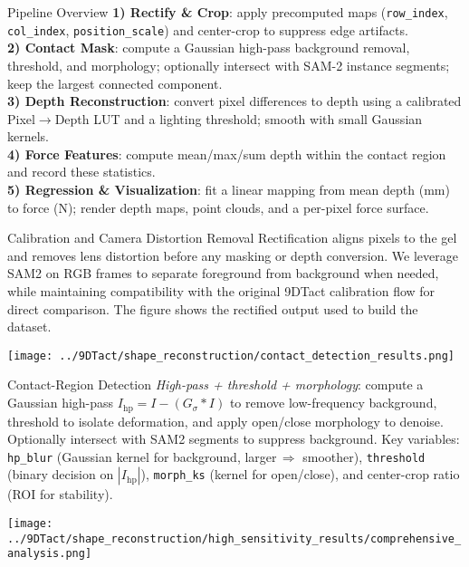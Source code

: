 \documentclass[final]{beamer}
\newlength{\colwidth}
\begin{document}
\begin{frame}[t]
\begin{columns}[t]
\begin{column}{\colwidth}
  \begin{alertblock}{Pipeline Overview}
  \textbf{1) Rectify \& Crop}: apply precomputed maps (\texttt{row\_index}, \texttt{col\_index}, \texttt{position\_scale}) and center-crop to suppress edge artifacts.\\
  \textbf{2) Contact Mask}: compute a Gaussian high-pass background removal, threshold, and morphology; optionally intersect with SAM-2 instance segments; keep the largest connected component.\\
  \textbf{3) Depth Reconstruction}: convert pixel differences to depth using a calibrated Pixel$\rightarrow$Depth LUT and a lighting threshold; smooth with small Gaussian kernels.\\
  \textbf{4) Force Features}: compute mean/max/sum depth within the contact region and record these statistics.\\
  \textbf{5) Regression \& Visualization}: fit a linear mapping from mean depth (mm) to force (N); render depth maps, point clouds, and a per-pixel force surface.
  \end{alertblock}

  \begin{block}{Calibration and Camera Distortion Removal}
  Rectification aligns pixels to the gel and removes lens distortion before any masking or depth conversion. We leverage SAM2 on RGB frames to separate foreground from background when needed, while maintaining compatibility with the original 9DTact calibration flow for direct comparison. The figure shows the rectified output used to build the dataset.
  \begin{center}
    \texttt{[image: ../9DTact/shape\_reconstruction/contact\_detection\_results.png]}
  \end{center}
  \end{block}

  \begin{block}{Contact-Region Detection}
  \textit{High-pass + threshold + morphology}: compute a Gaussian high-pass \(I_{\mathrm{hp}} = I - (G_{\sigma}\!*I)\) to remove low-frequency background, threshold to isolate deformation, and apply open/close morphology to denoise. Optionally intersect with SAM2 segments to suppress background. Key variables: \texttt{hp\_blur} (Gaussian kernel for background, larger\,$\Rightarrow$ smoother), \texttt{threshold} (binary decision on \(|I_{\mathrm{hp}}|\)), \texttt{morph\_ks} (kernel for open/close), and center-crop ratio (ROI for stability).  
  \begin{center}
    \texttt{[image: ../9DTact/shape\_reconstruction/high\_sensitivity\_results/comprehensive\_analysis.png]}
  \end{center}
  \end{block}
\end{column}


\end{columns}
\end{frame}
\end{document}
